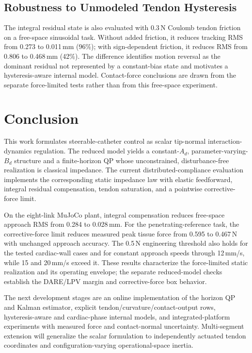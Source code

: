 \subsection{Robustness to Unmodeled Tendon Hysteresis}\label{sec:mujoco}

The integral residual state is also evaluated with 0.3\,N Coulomb tendon friction on a free-space sinusoidal task. Without added friction, it reduces tracking RMS from 0.273 to 0.011\,mm (96\%); with sign-dependent friction, it reduces RMS from 0.806 to 0.468\,mm (42\%). The difference identifies motion reversal as the dominant residual not represented by a constant-bias state and motivates a hysteresis-aware internal model. Contact-force conclusions are drawn from the separate force-limited tests rather than from this free-space experiment.

\section{Conclusion}\label{sec:conclusion}

This work formulates steerable-catheter control as scalar tip-normal interaction-dynamics regulation. The reduced model yields a constant-$A_d$, parameter-varying-$B_d$ structure and a finite-horizon QP whose unconstrained, disturbance-free realization is classical impedance. The current distributed-compliance evaluation implements the corresponding static impedance law with elastic feedforward, integral residual compensation, tendon saturation, and a pointwise corrective-force limit.

On the eight-link MuJoCo plant, integral compensation reduces free-space approach RMS from 0.284 to 0.028\,mm. For the penetrating-reference task, the corrective-force limit reduces measured peak tissue force from 0.595 to 0.467\,N with unchanged approach accuracy. The 0.5\,N engineering threshold also holds for the tested cardiac-wall cases and for constant approach speeds through 12\,mm/s, while 15 and 20\,mm/s exceed it. These results characterize the force-limited static realization and its operating envelope; the separate reduced-model checks establish the DARE/LPV margin and corrective-force box behavior.

The next development stages are an online implementation of the horizon QP and Kalman estimator, explicit tendon/curvature/contact-output rows, hysteresis-aware and cardiac-phase internal models, and integrated-platform experiments with measured force and contact-normal uncertainty. Multi-segment extension will generalize the scalar formulation to independently actuated tendon coordinates and configuration-varying operational-space inertia.

